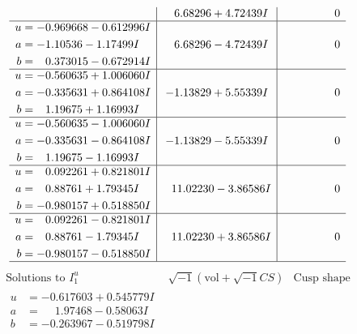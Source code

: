 \documentclass[1p]{elsarticle_modified}
\theoremstyle{definition}
\newcommand{\I}{\sqrt{-1}}
\begin{document}
$$\begin{array}{c|c|c}
 & \phantom{-}6.68296 + 4.72439 I & \phantom{-0.000000 } 0 \\ \hline\begin{aligned}
u &= -0.969668 - 0.612996 I \\
a &= -1.10536 - 1.17499 I \\
b &= \phantom{-}0.373015 - 0.672914 I\end{aligned}
 & \phantom{-}6.68296 - 4.72439 I & \phantom{-0.000000 } 0 \\ \hline\begin{aligned}
u &= -0.560635 + 1.006060 I \\
a &= -0.335631 + 0.864108 I \\
b &= \phantom{-}1.19675 + 1.16993 I\end{aligned}
 & -1.13829 + 5.55339 I & \phantom{-0.000000 } 0 \\ \hline\begin{aligned}
u &= -0.560635 - 1.006060 I \\
a &= -0.335631 - 0.864108 I \\
b &= \phantom{-}1.19675 - 1.16993 I\end{aligned}
 & -1.13829 - 5.55339 I & \phantom{-0.000000 } 0 \\ \hline\begin{aligned}
u &= \phantom{-}0.092261 + 0.821801 I \\
a &= \phantom{-}0.88761 + 1.79345 I \\
b &= -0.980157 + 0.518850 I\end{aligned}
 & \phantom{-}11.02230 - 3.86586 I & \phantom{-0.000000 } 0 \\ \hline\begin{aligned}
u &= \phantom{-}0.092261 - 0.821801 I \\
a &= \phantom{-}0.88761 - 1.79345 I \\
b &= -0.980157 - 0.518850 I\end{aligned}
 & \phantom{-}11.02230 + 3.86586 I & \phantom{-0.000000 } 0\\
 \hline 
 \end{array}$$\newpage$$\begin{array}{c|c|c}  
\text{Solutions to }I^u_{1}& \I (\text{vol} + \sqrt{-1}CS) & \text{Cusp shape}\\
 \hline 
\begin{aligned}
u &= -0.617603 + 0.545779 I \\
a &= \phantom{-}1.97468 - 0.58063 I \\
b &= -0.263967 - 0.519798 I\end{aligned}

\end{array}$$
\end{document}

